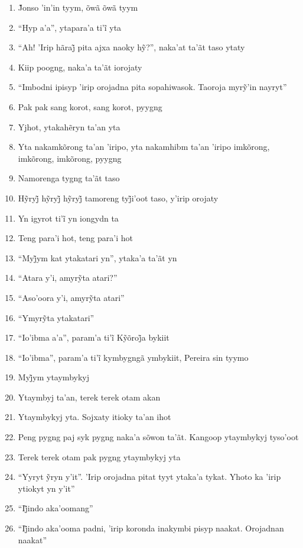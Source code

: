 \begin{enumerate}
 \item J̃onso ’in’in tyym, õwã õwã tyym
 \item ``Hyp a’a'', ytapara’a ti’ĩ yta
 \item ``Ah! ’Irip hãraj̃ pita ajxa naoky hỹ?'', naka’at ta’ãt taso ytaty
 \item Kiip poogng, naka'a ta'ãt iorojaty
 \item ``Imbodni ipisyp ’irip orojadna pita sopahiwasok. Taoroja myrỹ’in nayryt''
 \item Pak pak sang korot, sang korot, pyygng
 \item Yjhot, ytakahẽryn ta’an yta
 \item Yta nakamkõrong ta'an 'iripo, yta nakamhibm ta'an 'iripo imkõrong,
 imkõrong, imkõrong, pyygng
 \item Namorenga tygng ta'ãt taso
 \item Hỹryj̃ hỹryj̃ hỹryj̃ tamoreng tyj̃i’oot taso, y’irip orojaty
 \item Yn igyrot ti’ĩ yn iongydn ta
 \begin{center}\end{center}
 \item Teng para'i hot, teng para'i hot
 \item ``Myj̃ym kat ytakatari yn'', ytaka’a ta’ãt yn
 \item ``Atara y’i, amyrỹta atari?''
 \item ``Aso’oora y’i, amyrỹta atari''
 \item ``Ymyrỹta ytakatari''
 \item ``Io’ibma a’a'', param’a ti’ĩ Kỹõroj̃a bykiit
 \item ``Io’ibma'', param’a ti’ĩ kymbygngã ymbykiit, Pereira sin tyymo
 \item Myj̃ym ytaymbykyj
 \item Ytaymbyj ta'an, terek terek otam akan
 \begin{center}\end{center}
 \item Ytaymbykyj yta. Sojxaty itioky ta'an ihot
 \item Peng pygng paj syk pygng naka'a sõwon ta'ãt. Kangoop ytaymbykyj tyso'oot
 \item Terek terek otam pak pygng ytaymbykyj yta
 \item ``Yyryt ỹryn y’it''. ’Irip orojadna pitat tyyt ytaka’a tykat. Yhoto ka ’irip ytiokyt yn y’it''
 \item ``Ij̃indo aka’oomang''
 \item ``Ij̃indo aka’ooma padni, ’irip koronda inakymbi pisyp naakat. Orojadnan naakat''

\end{enumerate}
